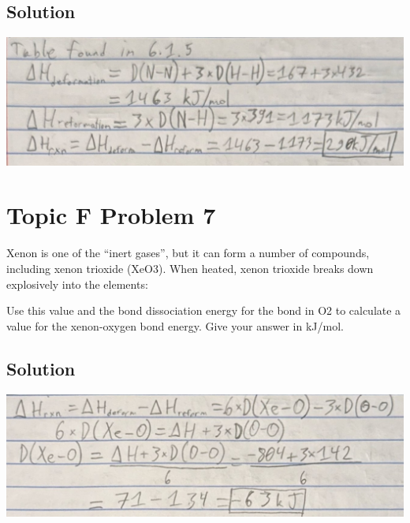 \documentclass[10pt]{article}
\begin{document}
        \subsection{Solution}
            \begin{center}
                \includegraphics[width=\textwidth]{Answers Images/F6.jpg}
            \end{center}


    \pagebreak
    \section{Topic F Problem 7}
        Xenon is one of the “inert gases”, but it can form a number of compounds, including xenon trioxide (XeO3). 
        When heated, xenon trioxide breaks down explosively into the elements:
        \begin{center}
        \end{center}
        Use this value and the bond dissociation energy for the bond in O2 to calculate a value for the xenon-oxygen bond energy. Give your answer in kJ/mol.
        
        \subsection{Solution}
            \begin{center}
                \includegraphics[width=\textwidth]{Answers Images/F7.jpg}
            \end{center}


    \pagebreak
\end{document}
